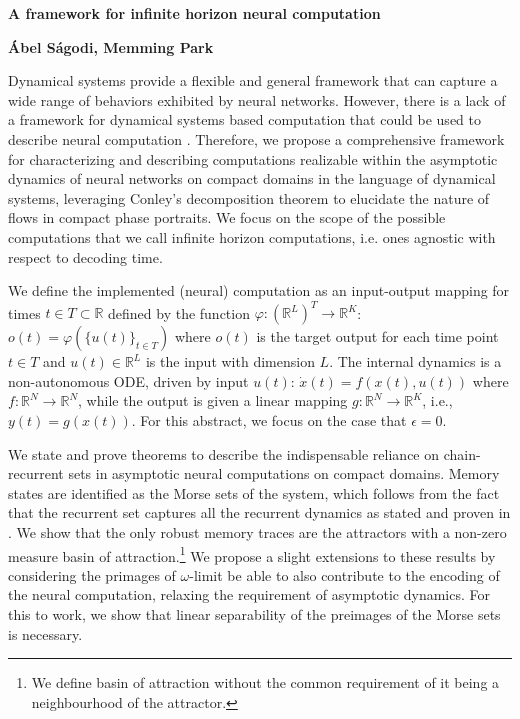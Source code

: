 \documentclass[12pt,letterpaper, onecolumn]{article}
\theoremstyle{definition}
\theoremstyle{remark}
\newcommand{\reals}{\mathbb{R}}
\begin{document}

\begin{center}
\LARGE{\textbf{A framework for infinite horizon neural computation}}
\end{center}
\begin{center}
{\textbf{\'Abel S\'agodi, Memming Park}}
\end{center}

Dynamical systems provide a flexible and general framework that can capture a wide range of behaviors exhibited by neural networks.
However, there is a lack of a framework for dynamical systems based computation that could be used to describe neural computation \cite{jaeger2021}.
Therefore, we propose a comprehensive framework for characterizing and describing computations realizable within the asymptotic dynamics of neural networks on compact domains in the language of dynamical systems, leveraging Conley's decomposition theorem to elucidate the nature of flows in compact phase portraits.
We focus on the scope of the possible computations that we call infinite horizon computations, i.e. ones agnostic with respect to decoding time. 

We define the implemented (neural) computation as an input-output mapping for times $t\in T\subset\reals$ defined by the function $\varphi:{(\reals^L)}^T\rightarrow\reals^K$: $o(t) = \varphi(\{u(t)\}_{t\in T})$
where $o(t)$ is the target output for each time point $t\in T$ and  $u(t)\in \reals^L$ is the input with dimension $L$.
The internal dynamics is a non-autonomous ODE, driven by input $u(t)$: $\dot x(t) = f(x(t),u(t))$ where $f:\reals^N\rightarrow\reals^N$,
while the output is given a linear mapping $g:\reals^N\rightarrow\reals^K$, i.e., $y(t) = g(x(t))$. For this abstract, we focus on the case that $\epsilon=0$.
 
We state and prove theorems to describe the indispensable reliance on chain-recurrent sets in asymptotic neural computations on compact domains. Memory states are identified as the Morse sets \cite{mischaikow1999} of the system, which follows from the fact that the recurrent set captures all the recurrent dynamics as stated and proven in \cite[Chapter I.8.2]{conley1978}. We show that the only robust memory traces are the attractors with a non-zero measure basin of attraction.\footnote{We define basin of attraction without the common requirement of it being a neighbourhood of the attractor.}
We propose a slight extensions to these results by considering the primages of $\omega$-limit be able to also contribute to the encoding of the neural computation, relaxing the requirement of asymptotic dynamics. For this to work, we show that linear separability of the preimages of the Morse sets is necessary.
\end{document}

